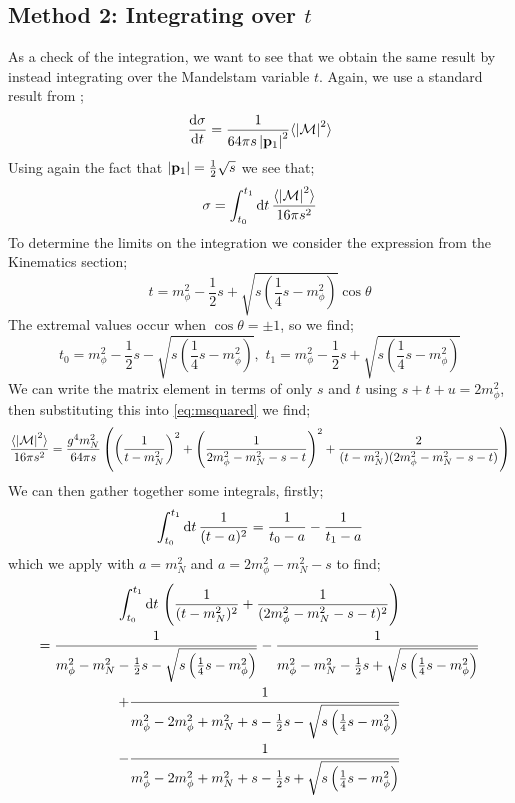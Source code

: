 \documentclass[10pt]{article}
\begin{document}
\subsection{Method 2: Integrating over $t$}
As a check of the integration, we want to see that we obtain the same result by instead integrating over the Mandelstam variable $t$. Again, we use a standard result from \cite{Thomson:2013zua};
\begin{equation}
\frac{\text{d} \sigma}{\text{d} t} = \frac{1}{64 \pi s \left| \mathbf{p}_1 \right|^2}\langle \left| \mathcal{M} \right|^2 \rangle
\end{equation}
Using again the fact that $\left| \mathbf{p}_1 \right| = \frac{1}{2}\sqrt{s}$ we see that;
\begin{equation*}
\sigma = \int_{t_0}^{t_1}{\text{d}t \,\frac{\langle \left| \mathcal{M} \right|^2 \rangle}{16 \pi s^2}}
\end{equation*}
To determine the limits on the integration we consider the expression from the Kinematics section;
\begin{equation*}
t = m_\phi^2 - \frac{1}{2}s + \sqrt{s\left(\frac{1}{4}s - m_\phi^2\right)}\cos\theta
\end{equation*}
The extremal values occur when $\cos\theta = \pm 1$, so we find;
\begin{equation}
t_0 = m_\phi^2 - \frac{1}{2}s - \sqrt{s\left(\frac{1}{4}s - m_\phi^2\right)}, \,\, t_1 = m_\phi^2 - \frac{1}{2}s + \sqrt{s\left(\frac{1}{4}s - m_\phi^2\right)}
\end{equation}
We can write the matrix element in terms of only $s$ and $t$ using $s + t + u = 2m_\phi^2$, then substituting this into \eqref{eq:msquared} we find;
\begin{equation*}
\frac{\langle \left| \mathcal{M} \right|^2 \rangle}{16\pi s^2} = \frac{g^4 m_N^2}{64\pi s}\left(\left(\frac{1}{t - m_N^2}\right)^2 + \left(\frac{1}{2m_\phi^2 - m_N^2 - s - t}\right)^2 + \frac{2}{(t - m_N^2)(2m_\phi^2 - m_N^2 - s - t)}\right)
\end{equation*}
We can then gather together some integrals, firstly;
\begin{equation*}
\int_{t_0}^{t_1}{\text{d}t \,\frac{1}{(t - a)^2}} = \frac{1}{t_0 - a} - \frac{1}{t_1 - a}
\end{equation*}
which we apply with $a = m_N^2$ and $a = 2m_\phi^2 - m_N^2 - s$ to find;
\begin{multline*}
\int_{t_0}^{t_1}{\text{d}t \,\left(\frac{1}{(t - m_N^2)^2} + \frac{1}{(2m_\phi^2 - m_N^2 - s - t)^2}\right)} \\ = \frac{1}{m_\phi^2 - m_N^2 - \frac{1}{2}s - \sqrt{s\left(\frac{1}{4}s - m_\phi^2\right)}} - \frac{1}{m_\phi^2 - m_N^2 - \frac{1}{2}s + \sqrt{s\left(\frac{1}{4}s - m_\phi^2\right)}} \\ + \frac{1}{m_\phi^2 - 2m_\phi^2 + m_N^2 + s - \frac{1}{2}s - \sqrt{s\left(\frac{1}{4}s - m_\phi^2\right)}} \\ - \frac{1}{m_\phi^2 - 2m_\phi^2 + m_N^2 + s - \frac{1}{2}s + \sqrt{s\left(\frac{1}{4}s - m_\phi^2\right)}}
\end{multline*}
\end{document}
